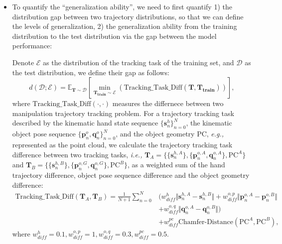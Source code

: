 \begin{itemize}
    \item \textcolor{myblue}{
    To quantify  the ``generalization ability'', we need to first quantify 1) the distribution gap between two trajectory distributions, so that we can define the levels of generalization, 2) the generalization ability from the training distribution to the test distribution via the gap between the model performance:
    }
    
    \textcolor{myblue}{Denote $\mathcal{E}$ as the distribution of the tracking task of the training set, and $\mathcal{D}$ as the test distribution, we define their  gap as follows: 
    \begin{equation}
        d(\mathcal{D};\mathcal{E}) = \mathbb{E}_{\mathbf{T}\sim \mathcal{D}} \left[ \min_{\mathbf{T_{train} \sim \mathcal{E}}} \left( \text{Tracking\_Task\_Diff} (\mathbf{T}, \mathbf{T_{train}}) \right) \right],
    \end{equation}
    where $\text{Tracking\_Task\_Diff}(\cdot,\cdot)$ measures the differnece between two manipulation trajectory tracking problem. 
    For a trajectory tracking task described by the kinematic hand state sequence $\{ \mathbf{s}_n^h \}_{n=0}^N$, the kinematic object pose sequence $\{ \mathbf{p}^o_n,  \mathbf{q}^o_n \}_{n=0}^N$, and the object geometry $\text{PC}$, \emph{e.g.,} represented as the point cloud, we calculate the trajectory tracking task difference between two tracking tasks, \textit{i.e.,} $\mathbf{T}_A = \{ \{ \mathbf{s}^{h,A}_n \}, \{ \mathbf{p}^{o,A}_n,  \mathbf{q}^{o,A}_n \}, \text{PC}^{A} \}$ and $\mathbf{T}_B = \{ \{ \mathbf{s}^{h,B}_n \}, \{ \mathbf{p}^{o,G}_n,  \mathbf{q}^{o,G}_n \}, \text{PC}^{B} \}$, as a weighted sum of the hand trajectory difference, object pose sequence difference and the object geometry difference: 
    \begin{align}
        \text{Tracking\_Task\_Diff}(\mathbf{T}_A, \mathbf{T}_B) = \frac{1}{N+1} \sum_{n=0}^{N} &( w^{h}_{diff} \Vert \mathbf{s}_{n}^{h,A} - \mathbf{s}_{n}^{h,B} \Vert + w_{diff}^{o,p} \Vert \mathbf{p}^{o,A}_n - \mathbf{p}^{o,B}_n  \Vert \\ &+ w_{diff}^{o,q} \Vert \mathbf{q}^{o,A}_n - \mathbf{q}^{o,B}_n  \Vert ) \\ &+ w_{diff}^{pc}\text{Chamfer-Distance}(\text{PC}^A, \text{PC}^B),
    \end{align}
    where $w_{diff}^h=0.1, w_{diff}^{o,p} =1, w_{diff}^{o,q} =0.3, w_{diff}^{pc}=0.5$. 
}
\end{itemize}
